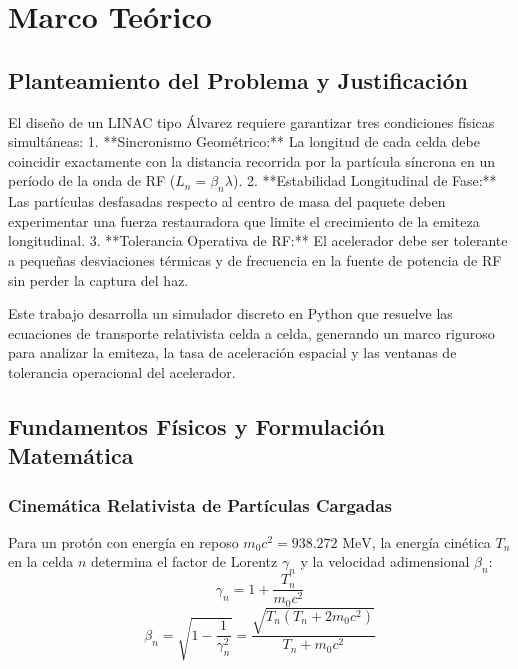 
\chapter{Marco Teórico}


\section{Planteamiento del Problema y Justificación}
El diseño de un LINAC tipo Álvarez requiere garantizar tres condiciones físicas simultáneas:
1. **Sincronismo Geométrico:** La longitud de cada celda debe coincidir exactamente con la distancia recorrida por la partícula síncrona en un período de la onda de RF ($L_n = \beta_n \lambda$).
2. **Estabilidad Longitudinal de Fase:** Las partículas desfasadas respecto al centro de masa del paquete deben experimentar una fuerza restauradora que limite el crecimiento de la emiteza longitudinal.
3. **Tolerancia Operativa de RF:** El acelerador debe ser tolerante a pequeñas desviaciones térmicas y de frecuencia en la fuente de potencia de RF sin perder la captura del haz.

Este trabajo desarrolla un simulador discreto en Python que resuelve las ecuaciones de transporte relativista celda a celda, generando un marco riguroso para analizar la emiteza, la tasa de aceleración espacial y las ventanas de tolerancia operacional del acelerador.
\section{Fundamentos Físicos y Formulación Matemática}

\subsection{Cinemática Relativista de Partículas Cargadas}
Para un protón con energía en reposo $m_0 c^2 = 938.272\text{ MeV}$, la energía cinética $T_n$ en la celda $n$ determina el factor de Lorentz $\gamma_n$ y la velocidad adimensional $\beta_n$:
\begin{equation}
\gamma_n = 1 + \frac{T_n}{m_0 c^2}
\end{equation}
\begin{equation}
\beta_n = \sqrt{1 - \frac{1}{\gamma_n^2}} = \frac{\sqrt{T_n (T_n + 2 m_0 c^2)}}{T_n + m_0 c^2}
\end{equation}

